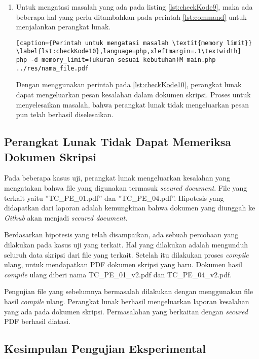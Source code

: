 \begin{enumerate}
	\item Untuk mengatasi masalah yang ada pada listing \ref{lst:checkKode9}, maka ada beberapa hal yang perlu ditambahkan pada perintah \ref{lst:command} untuk menjalankan perangkat lunak.

\begin{lstlisting}[caption={Perintah untuk mengatasi masalah \textit{memory limit}}	\label{lst:checkKode10},language=php,xleftmargin=.1\textwidth]
php -d memory_limit=(ukuran sesuai kebutuhan)M main.php ../res/nama_file.pdf
\end{lstlisting}

	Dengan menggunakan perintah pada \ref{lst:checkKode10}, perangkat lunak dapat mengeluarkan pesan kesalahan dalam dokumen skripsi. Proses untuk menyelesaikan masalah, bahwa perangkat lunak tidak mengeluarkan pesan pun telah berhasil diselesaikan.

\end{enumerate}

\subsection{Perangkat Lunak Tidak Dapat Memeriksa Dokumen Skripsi}
\label{secured}

Pada beberapa kasus uji, perangkat lunak mengeluarkan kesalahan yang mengatakan bahwa file yang digunakan termasuk \textit{secured document}. File yang terkait yaitu ''TC\_PE\_01.pdf'' dan ''TC\_PE\_04.pdf''. Hipotesis yang didapatkan dari laporan adalah kemungkinan bahwa dokumen yang diunggah ke \textit{Github} akan menjadi \textit{secured document}.

Berdasarkan hipotesis yang telah disampaikan, ada sebuah percobaan yang dilakukan pada kasus uji yang terkait. Hal yang dilakukan adalah mengunduh seluruh data skripsi dari file yang terkait. Setelah itu dilakukan proses \textit{compile} ulang, untuk mendapatkan PDF dokumen skripsi yang baru. Dokumen hasil \textit{compile} ulang diberi nama TC\_PE\_01\_v2.pdf dan TC\_PE\_04\_v2.pdf. 

Pengujian file yang sebelumnya bermasalah dilakukan dengan menggunakan file hasil \textit{compile} ulang. Perangkat lunak berhasil mengeluarkan laporan kesalahan yang ada pada dokumen skripsi. Permasalahan yang berkaitan dengan \textit{secured} PDF berhasil diatasi.

\subsection{Kesimpulan Pengujian Eksperimental}

